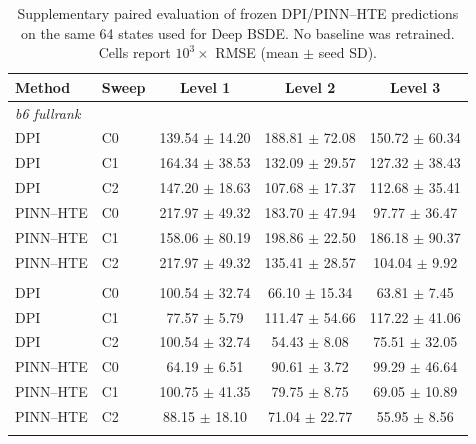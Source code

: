 \begin{table}[t]
\centering\small
\caption{Supplementary paired evaluation of frozen DPI/PINN--HTE predictions on the same 64 states used for Deep BSDE. No baseline was retrained. Cells report $10^3\!\times$ RMSE (mean $\pm$ seed SD).}
\label{tab:matched-existing-64}
\begin{tabular}{llccc}
\toprule
Method & Sweep & Level 1 & Level 2 & Level 3 \\
\midrule
\multicolumn{5}{l}{\emph{b6 fullrank}} \\
DPI & C0 & 139.54 $\pm$ 14.20 & 188.81 $\pm$ 72.08 & 150.72 $\pm$ 60.34 \\
DPI & C1 & 164.34 $\pm$ 38.53 & 132.09 $\pm$ 29.57 & 127.32 $\pm$ 38.43 \\
DPI & C2 & 147.20 $\pm$ 18.63 & 107.68 $\pm$ 17.37 & 112.68 $\pm$ 35.41 \\
PINN--HTE & C0 & 217.97 $\pm$ 49.32 & 183.70 $\pm$ 47.94 & 97.77 $\pm$ 36.47 \\
PINN--HTE & C1 & 158.06 $\pm$ 80.19 & 198.86 $\pm$ 22.50 & 186.18 $\pm$ 90.37 \\
PINN--HTE & C2 & 217.97 $\pm$ 49.32 & 135.41 $\pm$ 28.57 & 104.04 $\pm$ 9.92 \\
\addlinespace
\multicolumn{5}{l}{\emph{dense fourier}} \\
DPI & C0 & 100.54 $\pm$ 32.74 & 66.10 $\pm$ 15.34 & 63.81 $\pm$ 7.45 \\
DPI & C1 & 77.57 $\pm$ 5.79 & 111.47 $\pm$ 54.66 & 117.22 $\pm$ 41.06 \\
DPI & C2 & 100.54 $\pm$ 32.74 & 54.43 $\pm$ 8.08 & 75.51 $\pm$ 32.05 \\
PINN--HTE & C0 & 64.19 $\pm$ 6.51 & 90.61 $\pm$ 3.72 & 99.29 $\pm$ 46.64 \\
PINN--HTE & C1 & 100.75 $\pm$ 41.35 & 79.75 $\pm$ 8.75 & 69.05 $\pm$ 10.89 \\
PINN--HTE & C2 & 88.15 $\pm$ 18.10 & 71.04 $\pm$ 22.77 & 55.95 $\pm$ 8.56 \\
\addlinespace
\bottomrule
\end{tabular}
\end{table}
